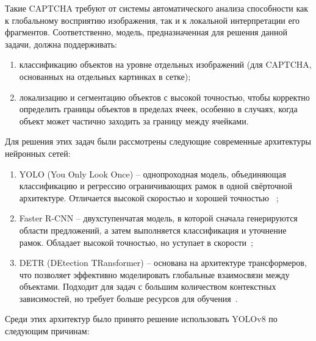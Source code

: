 Такие CAPTCHA требуют от системы автоматического анализа способности как к 
глобальному восприятию изображения, так и к локальной интерпретации его 
фрагментов. Соответственно, модель, предназначенная для решения данной задачи, 
должна поддерживать:

\begin{enumerate}
    \item классификацию объектов на уровне отдельных изображений (для CAPTCHA, 
    основанных на отдельных картинках в сетке);
    \item локализацию и сегментацию объектов с высокой точностью, чтобы 
    корректно определить границы объектов в пределах ячеек, особенно в случаях, 
    когда объект может частично заходить за границу между ячейками.
\end{enumerate}

Для решения этих задач были рассмотрены следующие современные архитектуры 
нейронных сетей:

\begin{enumerate}
    \item YOLO (You Only Look Once) -- однопроходная модель, объединяющая 
    классификацию и регрессию ограничивающих рамок в одной свёрточной 
    архитектуре. Отличается высокой скоростью и хорошей точностью~
    \cite{redmon2016yolov2, UltralyticsYOLOv8};
    \item Faster R-CNN -- двухступенчатая модель, в которой сначала генерируются 
    области предложений, а затем выполняется классификация и уточнение рамок. 
    Обладает высокой точностью, но уступает в скорости~\cite{ren2015fasterrcnn};
    \item DETR (DEtection TRansformer) -- основана на архитектуре трансформеров, 
    что позволяет эффективно моделировать глобальные взаимосвязи между объектами. 
    Подходит для задач с большим количеством контекстных зависимостей, но требует 
    больше ресурсов для обучения~\cite{carion2020detr}.
\end{enumerate}

Среди этих архитектур было принято решение использовать YOLOv8 по следующим 
причинам:


